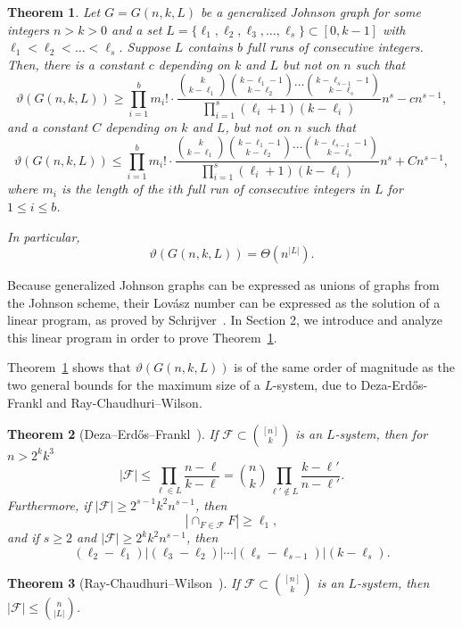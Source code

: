 \documentclass[11pt]{article}
\newtheorem{theorem}{Theorem}[section]
\theoremstyle{definition}
\theoremstyle{remark}
\newcommand{\cF}{\mathcal{F}}
\begin{document}
\begin{theorem}\label{thm:genlovaszbd}
Let $G = G(n, k, L)$ be a generalized Johnson graph for some integers $n > k > 0$ and a set $L = \{\ell_1, \ell_2, \ell_3, \ldots, \ell_s\} \subset [0, k-1]$ with $\ell_1 < \ell_2 < \ldots < \ell_s$. Suppose $L$ contains $b$ full runs of consecutive integers. Then, there is a constant $c$ depending on $k$ and $L$ but not on $n$ such that 
\[\vartheta(G(n, k, L))\ge \prod_{i=1}^{b}m_i!\cdot\frac{\binom{k}{k-\ell_1}\binom{k-\ell_1-1}{k-\ell_2}\cdots \binom{k-\ell_{s-1}-1}{k-\ell_s}}{\prod_{i=1}^s(\ell_i+1)(k-\ell_i)}n^s -cn^{s-1} ,\]
and a constant $C$ depending on $k$ and $L$, but not on  $n$ such that
\[\vartheta(G(n, k, L))\le \prod_{i=1}^{b}m_i!\cdot\frac{\binom{k}{k-\ell_1}\binom{k-\ell_1-1}{k-\ell_2}\cdots \binom{k-\ell_{s-1}-1}{k-\ell_s}}{\prod_{i=1}^s(\ell_i+1)(k-\ell_i)}n^s +Cn^{s-1},\]
where $m_i$ is the length of the $i$th full run of consecutive integers in $L$ for $1\le i\le b$. 

In particular,  
\[\vartheta(G(n, k, L)) = \Theta(n^{|L|}).\]
\end{theorem}

Because generalized Johnson graphs can be expressed as unions of graphs from the Johnson scheme, their Lov\'asz number can be expressed as the solution of a linear program, as proved by Schrijver~\cite{Sch1979}. In Section 2, we introduce and analyze this linear program in order to prove Theorem~\ref{thm:genlovaszbd}. 

Theorem~\ref{thm:genlovaszbd} shows that $\vartheta(G(n, k, L))$  is of the same order of magnitude as the two general bounds for the maximum size of a $L$-system, due to Deza-Erd\H{o}s-Frankl and Ray-Chaudhuri--Wilson. 

\begin{theorem}[Deza--Erd\H{o}s--Frankl~\cite{DEZ}]\label{dezthm}
If $\cF \subset \binom{[n]}{k}$ is an $L$-system, then for $n > 2^kk^3$
\[|\cF| \le \prod_{\ell \in L}\frac{n-\ell}{k-\ell} = \binom{n}{k} \prod_{\ell' \notin L}\frac{k-\ell'}{n-\ell'}.\]
Furthermore, if $|\cF| \ge 2^{s-1}k^2n^{s-1}$, then 
\[|\cap_{F\in \cF}F| \ge \ell_1,\]
and if $s\ge 2$ and $|\cF| \ge 2^kk^2n^{s-1}$, then 
\[(\ell_2 - \ell_1) | (\ell_3 - \ell_2) | \cdots | (\ell_s - \ell_{s-1}) | (k-\ell_s).\]
\end{theorem}

\begin{theorem}[Ray-Chaudhuri--Wilson~\cite{RCW}]\label{rcwthm}
If $\cF \subset \binom{[n]}{k}$ is an $L$-system, 
then $|\cF| \le \binom{n}{|L|}$.
\end{theorem}
\end{document}
